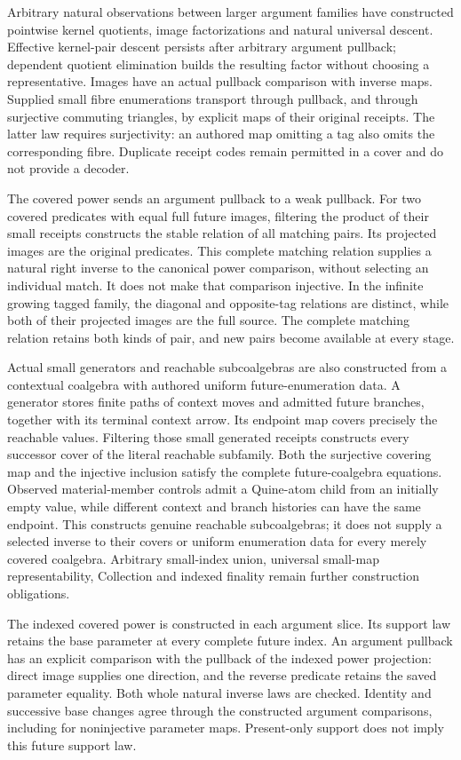 \documentclass[11pt]{article}
\theoremstyle{definition}
\theoremstyle{remark}
\begin{document}
Arbitrary natural observations between larger argument families have
constructed pointwise kernel quotients, image factorizations and natural
universal descent.  Effective kernel-pair descent persists after arbitrary
argument pullback; dependent quotient elimination builds the resulting
factor without choosing a representative.  Images have an actual
pullback comparison with inverse maps.  Supplied small fibre enumerations
transport through pullback, and through surjective commuting triangles,
by explicit maps of their original receipts.  The latter law requires
surjectivity: an authored map omitting a tag also omits the corresponding
fibre.  Duplicate receipt codes remain permitted in a cover and do not
provide a decoder.

The covered power sends an argument pullback to a weak pullback.  For two
covered predicates with equal full future images, filtering the product
of their small receipts constructs the stable relation of all matching
pairs.  Its projected images are the original predicates.  This complete
matching relation supplies a natural right inverse to the canonical
power comparison, without selecting an individual match.  It does not
make that comparison injective.  In the infinite growing tagged family,
the diagonal and opposite-tag relations are distinct, while both of
their projected images are the full source.  The complete matching
relation retains both kinds of pair, and new pairs become available at
every stage.

Actual small generators and reachable subcoalgebras are also constructed
from a contextual coalgebra with authored uniform future-enumeration data.
A generator stores finite paths of context moves and admitted future
branches, together with its terminal context arrow.  Its endpoint map
covers precisely the reachable values.  Filtering those small generated
receipts constructs every successor cover of the literal reachable
subfamily.  Both the surjective covering map and the injective inclusion
satisfy the complete future-coalgebra equations.  Observed material-member
controls admit a Quine-atom child from an initially empty value, while
different context and branch histories can have the same endpoint.  This
constructs genuine reachable subcoalgebras; it does not supply a selected
inverse to their covers or uniform enumeration data for every merely
covered coalgebra.  Arbitrary small-index union, universal small-map
representability, Collection and indexed finality remain further
construction obligations.

The indexed covered power is constructed in each argument slice.  Its
support law retains the base parameter at every complete future index.
An argument pullback has an explicit comparison with the pullback of
the indexed power projection: direct image supplies one direction,
and the reverse predicate retains the saved parameter equality.
Both whole natural inverse laws are checked.  Identity and successive
base changes agree through the constructed argument comparisons,
including for noninjective parameter maps.  Present-only support does
not imply this future support law.
\end{document}

